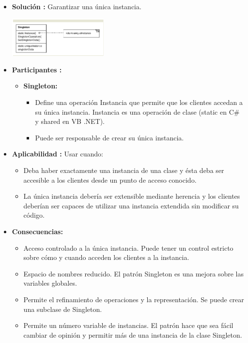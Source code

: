\documentclass[twoside,twocolumn]{article}
\begin{document}
\begin{itemize}
\begin{itemize}
		\item \textbf{Solución :} Garantizar una única instancia. 
			\begin{center}
			    \includegraphics[width=5cm]{./img/imagen1.png} 
            \end{center}
		\item \textbf{Participantes :}	
        \begin{itemize}
        \item \textbf{Singleton:}	
            \begin{itemize}
                \item Define una operación Instancia que permite que los clientes accedan a su única instancia. Instancia es una operación de clase (static en C# y shared en VB .NET). 	
                \item Puede ser responsable de crear su única instancia.  	
            \end{itemize}
        \end{itemize}    

		\item \textbf{Aplicabilidad :} Usar cuando: 
        \begin{itemize}
            \item Deba haber exactamente una instancia de una clase y ésta deba ser accesible a los clientes desde un punto de acceso conocido.  	
            \item La única instancia debería ser extensible mediante herencia y los clientes deberían ser capaces de utilizar una instancia extendida sin modificar su código. 	
        \end{itemize}

		\item \textbf{Consecuencias:} 
        \begin{itemize}
            \item Acceso controlado a la única instancia. Puede tener un control estricto sobre cómo y cuando acceden los clientes a la instancia.   	
            \item Espacio de nombres reducido. El patrón Singleton es una mejora sobre las variables globales. 	   
            \item Permite el refinamiento de operaciones y la representación. Se puede crear una subclase de Singleton.   
            \item Permite un número variable de instancias. El patrón hace que sea fácil cambiar de opinión y permitir más de una instancia de la clase Singleton.  	
        \end{itemize}
	\end{itemize}
	

\end{itemize}
\end{document}
